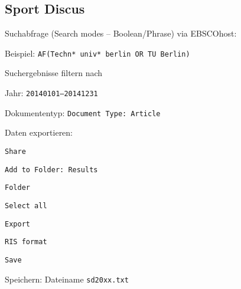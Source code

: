 \subsection*{Sport Discus}
\begin{compactitem}
\item Suchabfrage (Search modes -- Boolean/Phrase) via EBSCOhost: 
	\begin{compactitem}
	\item Beispiel: \texttt{AF(Techn* univ* berlin OR TU Berlin)}
	\end{compactitem}
\item Suchergebnisse filtern nach
	\begin{compactitem}
    \item Jahr: \texttt{20140101--20141231}
    \item Dokumententyp: \texttt{Document Type: Article}
    \end{compactitem}
\item Daten exportieren: 
	\begin{compactitem}
	\item \texttt{Share}
    \item \texttt{Add to Folder: Results}
    \item \texttt{Folder}
    \item \texttt{Select all}
    \item \texttt{Export}
    \item \texttt{RIS format}
    \item \texttt{Save}
	\end{compactitem}
\item Speichern: Dateiname \texttt{sd20xx.txt}
\end{compactitem}

